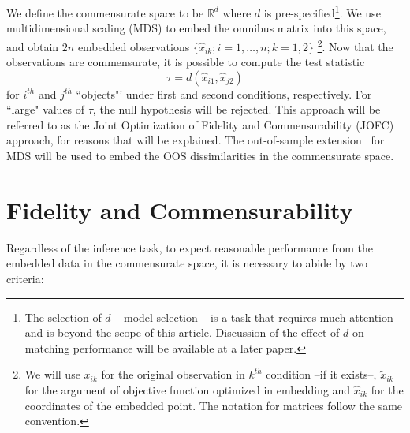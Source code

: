 \documentclass[11pt]{article} %
\begin{document}
We define the commensurate space to be  $\mathbb{R}^d$ where $d$ is pre-specified\footnote{ The selection of $d$ -- model selection -- is  a task that requires much attention and is  beyond the scope of this article. Discussion of the effect of $d$ on matching performance will be available at a later paper. }. We use multidimensional scaling (MDS) \cite{borg+groenen:1997} to embed  the omnibus matrix into this  space, and obtain $2n$ embedded observations $\{\hat{x}_{ik}; i=1,\ldots,n;k=1,2\}$ \footnote{We will use $x_{ik}$ for the original observation  in $k^{th}$ condition --if it exists--, $\tilde{x}_{ik}$ for the argument of objective function optimized in embedding and  $\hat{x}_{ik}$ for the coordinates of the embedded point. The notation for matrices follow the  same convention. }. Now that the observations are commensurate, it is possible to  compute the test statistic \[
\tau=d\left(\hat{x}_{i1},\hat{x}_{j2}\right)\label{teststat}
\] for $i^{th}$ and $j^{th}$ ``objects"' under first and second conditions, respectively.  For ``large" values of $\tau$, the null hypothesis will be rejected. This approach will be referred to as the Joint Optimization of Fidelity and Commensurability (JOFC) approach, for reasons that will be explained. The  out-of-sample extension~\cite{TrossetOOS} for MDS will be used to embed the OOS dissimilarities in the commensurate space.
\section{Fidelity and Commensurability}
Regardless of the inference task,  to expect reasonable performance from the embedded data in the commensurate space, 
it is necessary to abide by two criteria: %
\end{document}
